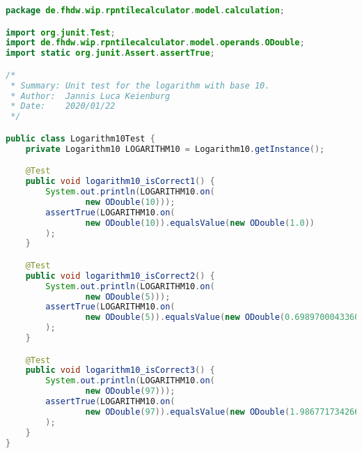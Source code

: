 \begin{lstlisting}[caption=Logarithm10Test (Keienburg),label=list:Logarithm10Test,language=Java]
package de.fhdw.wip.rpntilecalculator.model.calculation;

import org.junit.Test;
import de.fhdw.wip.rpntilecalculator.model.operands.ODouble;
import static org.junit.Assert.assertTrue;

/*
 * Summary: Unit test for the logarithm with base 10. 
 * Author:  Jannis Luca Keienburg
 * Date:    2020/01/22
 */

public class Logarithm10Test {
    private Logarithm10 LOGARITHM10 = Logarithm10.getInstance();

    @Test
    public void logarithm10_isCorrect1() {
        System.out.println(LOGARITHM10.on(
                new ODouble(10)));
        assertTrue(LOGARITHM10.on(
                new ODouble(10)).equalsValue(new ODouble(1.0))
        );
    }

    @Test
    public void logarithm10_isCorrect2() {
        System.out.println(LOGARITHM10.on(
                new ODouble(5)));
        assertTrue(LOGARITHM10.on(
                new ODouble(5)).equalsValue(new ODouble(0.6989700043360189))
        );
    }

    @Test
    public void logarithm10_isCorrect3() {
        System.out.println(LOGARITHM10.on(
                new ODouble(97)));
        assertTrue(LOGARITHM10.on(
                new ODouble(97)).equalsValue(new ODouble(1.9867717342662448))
        );
    }
}
\end{lstlisting} 

